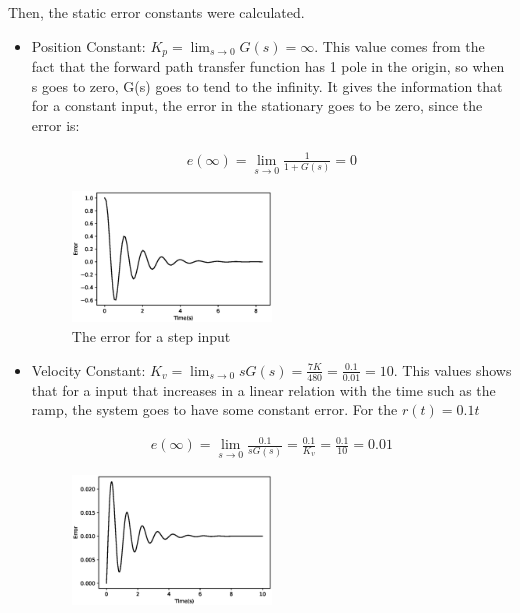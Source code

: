\documentclass[a4paper]{article}
\begin{document}
Then, the static error constants were calculated.
\begin{itemize}
    \item Position Constant: $K_p = \lim_{s\rightarrow 0}G(s)=\infty$. This value comes from the fact that the forward path transfer function has 1 pole in the origin, so when s goes to zero, G(s) goes to tend to the infinity. It gives the information that for a constant input, the error in the stationary goes to be zero, since the error is:
\begin{multicols}{2} 
    \begin{align*}
    e(\infty)=\lim_{s\rightarrow 0}\frac{1}{1+G(s)}=0
    \end{align*}
    \columnbreak
    \begin{figure}[H]
    \centering
    \includegraphics[width=0.5\textwidth]{Figures/Question5/EXE_5_step_error.eps}
    \caption{The error for a step input}
    \end{figure}
\end{multicols}
	\item Velocity Constant:   $K_v = \lim_{s\rightarrow 0}sG(s)=\frac{7K}{480}=\frac{0.1}{0.01}=10$. This values shows that for a input that increases in a linear relation with the time such as the ramp, the system goes to have some constant error. For the $r(t) = 0.1t$
\begin{multicols}{2}	
	\begin{align*}
    e(\infty)=\lim_{s\rightarrow 0}\frac{0.1}{sG(s)}=\frac{0.1}{K_v}=\frac{0.1}{10}=0.01
    \end{align*}
    \columnbreak		
	\begin{figure}[H]
    \centering
    \includegraphics[width=0.5\textwidth]{Figures/Question5/EXE_5_ITEM_2.eps}

\end{figure}
\end{multicols}
\end{itemize}
\end{document}
